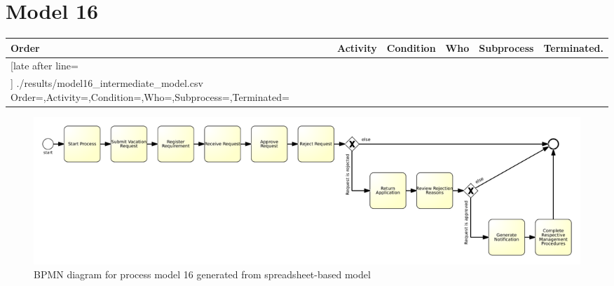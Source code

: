 \section{Model 16}
\begin{tcolorbox}[
	breakable,
	arc=0mm,
	left=1pt,
	right = 1pt,
	boxrule=0mm,
	colback = {white},
	]
	\texttt{}
\end{tcolorbox}
\label{txt:model16}

{\scriptsize
	\begin{longtable}{|p{0.03 \hsize}|p{0.25 \hsize}|p{0.15 \hsize}|p{0.2 \hsize}|p{0.1 \hsize}|p{0.1 \hsize}|}
		\hline
		Order & Activity & Condition & Who & Subprocess & Terminated.
		\\\hline\hline
		\csvreader[late after line=\\\hline]
		{./results/model16_intermediate_model.csv}
		{Order=\Order,Activity=\Activity,Condition=\Condition,Who=\Who,Subprocess=\Subprocess,Terminated=\Terminated}
		{\Order & \Activity & \Condition & \Who & \Subprocess & \Terminated}
		\caption{Spreadsheet-based description for process model 16}
		\label{csv:model16}
	\end{longtable}
}

\begin{figure}[H]
	\centering
	\includegraphics[width=\hsize]{./generated_bpmn/model16.pdf}
	\caption{BPMN diagram for process model 16 generated from spreadsheet-based model}
	\label{bpmn:generated_model16}
\end{figure}

